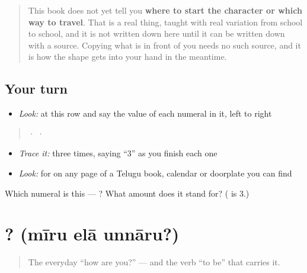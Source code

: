 \begin{quote}
This book does not yet tell you \textbf{where to start the character or which way to travel}. That is a real thing, taught with real variation from school to school, and it is not written down here until it can be written down with a source. Copying what is in front of you needs no such source, and it is how the shape gets into your hand in the meantime.
\end{quote}

\subsection*{Your turn}
\begin{itemize}
\raggedright
  \item \emph{Look:} at this row and say the value of each numeral in it, left to right
\end{itemize}

\begin{quote}
  ·    ·  
\end{quote}

\begin{itemize}
\raggedright
  \item \emph{Trace it:}  three times, saying \textquotedblleft{}3\textquotedblright{} as you finish each one
  \item \emph{Look:} for  on any page of a Telugu book, calendar or doorplate you can find
\end{itemize}

\begin{tcolorbox}[breakable,colback=teal!4,colframe=teal!35!black,title={Before you move on}]
Which numeral is this — ? What amount does it stand for? ( is 3.)
\end{tcolorbox}
\section[\texorpdfstring{\te{మీరు} \te{ఎలా} \te{ఉన్నారు}? (mīru elā unnāru?)}{మీరు ఎలా ఉన్నారు? (mīru elā unnāru?)}]{  ? (mīru elā unnāru?)}

\label{lesson:TE-C03-miiru-elaa-unnaaru}



\begin{quote}
The everyday \textquotedblleft{}how are you?\textquotedblright{} — and the verb \textquotedblleft{}to be\textquotedblright{} that carries it.
\end{quote}

